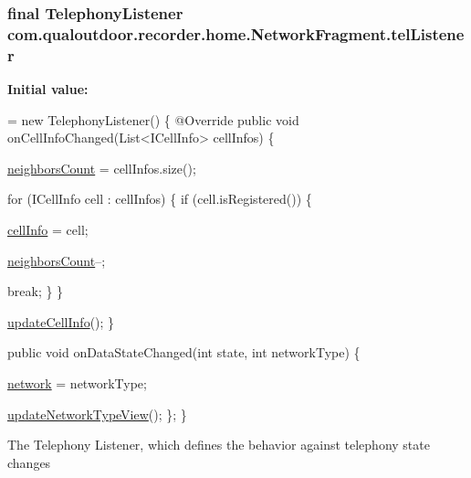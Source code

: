 \hypertarget{classcom_1_1qualoutdoor_1_1recorder_1_1home_1_1NetworkFragment_ad5a2cd1711f52e14b57a04baa87c3ef4}{
\subsubsection[{tel\-Listener}]{\setlength{\rightskip}{0pt plus 5cm}final {\bf Telephony\-Listener} com.\-qualoutdoor.\-recorder.\-home.\-Network\-Fragment.\-tel\-Listener\hspace{0.3cm}{\ttfamily [private]}}}\label{classcom_1_1qualoutdoor_1_1recorder_1_1home_1_1NetworkFragment_ad5a2cd1711f52e14b57a04baa87c3ef4}
{\bfseries Initial value\-:}
\begin{DoxyCode}
= \textcolor{keyword}{new} TelephonyListener() \{
        @Override
        \textcolor{keyword}{public} \textcolor{keywordtype}{void} onCellInfoChanged(List<ICellInfo> cellInfos) \{
            
            \hyperlink{classcom_1_1qualoutdoor_1_1recorder_1_1home_1_1NetworkFragment_a98e0d9ad80321ac12baeacb95f7d6cd7}{neighborsCount} = cellInfos.size();
            
            \textcolor{keywordflow}{for} (ICellInfo cell : cellInfos) \{
                \textcolor{keywordflow}{if} (cell.isRegistered()) \{
                    
                    \hyperlink{classcom_1_1qualoutdoor_1_1recorder_1_1home_1_1NetworkFragment_a5987f3378b351e0c9e9b8520074a7e2d}{cellInfo} = cell;
                    
                    \hyperlink{classcom_1_1qualoutdoor_1_1recorder_1_1home_1_1NetworkFragment_a98e0d9ad80321ac12baeacb95f7d6cd7}{neighborsCount}--;

                    
                    \textcolor{keywordflow}{break};
                \}
            \}
            
            \hyperlink{classcom_1_1qualoutdoor_1_1recorder_1_1home_1_1NetworkFragment_ac3d1f4da7e20d224cb3f3e6a5c9baac4}{updateCellInfo}();
        \}

        \textcolor{keyword}{public} \textcolor{keywordtype}{void} onDataStateChanged(\textcolor{keywordtype}{int} state, \textcolor{keywordtype}{int} networkType) \{
            
            \hyperlink{classcom_1_1qualoutdoor_1_1recorder_1_1home_1_1NetworkFragment_a77658d6cfaaf2f11c93f8b018b3ccacf}{network} = networkType;
            
            \hyperlink{classcom_1_1qualoutdoor_1_1recorder_1_1home_1_1NetworkFragment_a903fb8aa5cc3e80f765d1a0a237168b2}{updateNetworkTypeView}();
        \};
    \}
\end{DoxyCode}
The Telephony Listener, which defines the behavior against telephony state changes 

